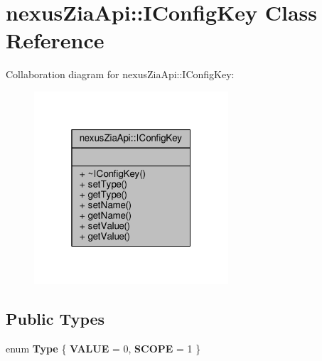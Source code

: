 \hypertarget{classnexusZiaApi_1_1IConfigKey}{}\section{nexus\+Zia\+Api\+:\+:I\+Config\+Key Class Reference}
\label{classnexusZiaApi_1_1IConfigKey}


Collaboration diagram for nexus\+Zia\+Api\+:\+:I\+Config\+Key\+:\nopagebreak
\begin{figure}[H]
\begin{center}
\leavevmode
\includegraphics[width=205pt]{classnexusZiaApi_1_1IConfigKey__coll__graph}
\end{center}
\end{figure}
\subsection*{Public Types}
\begin{DoxyCompactItemize}
\item 
enum {\bfseries Type} \{ {\bfseries V\+A\+L\+UE} = 0, 
{\bfseries S\+C\+O\+PE} = 1
 \}\hypertarget{classnexusZiaApi_1_1IConfigKey_a671e0d0f087fe2656476c17378a9778d}{}\label{classnexusZiaApi_1_1IConfigKey_a671e0d0f087fe2656476c17378a9778d}

\end{DoxyCompactItemize}
